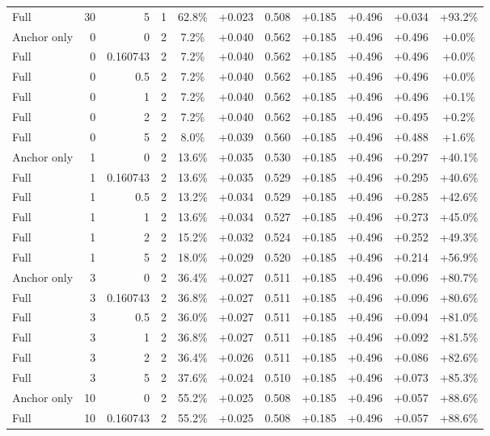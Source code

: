 \begin{table}[htbp]
\begin{tabular}{lrrrccccccc}
Full & 30 & 5 & 1 & 62.8\% & +0.023 & 0.508 & +0.185 & +0.496 & +0.034 & +93.2\% \\
Anchor only & 0 & 0 & 2 & 7.2\% & +0.040 & 0.562 & +0.185 & +0.496 & +0.496 & +0.0\% \\
Full & 0 & 0.160743 & 2 & 7.2\% & +0.040 & 0.562 & +0.185 & +0.496 & +0.496 & +0.0\% \\
Full & 0 & 0.5 & 2 & 7.2\% & +0.040 & 0.562 & +0.185 & +0.496 & +0.496 & +0.0\% \\
Full & 0 & 1 & 2 & 7.2\% & +0.040 & 0.562 & +0.185 & +0.496 & +0.496 & +0.1\% \\
Full & 0 & 2 & 2 & 7.2\% & +0.040 & 0.562 & +0.185 & +0.496 & +0.495 & +0.2\% \\
Full & 0 & 5 & 2 & 8.0\% & +0.039 & 0.560 & +0.185 & +0.496 & +0.488 & +1.6\% \\
Anchor only & 1 & 0 & 2 & 13.6\% & +0.035 & 0.530 & +0.185 & +0.496 & +0.297 & +40.1\% \\
Full & 1 & 0.160743 & 2 & 13.6\% & +0.035 & 0.529 & +0.185 & +0.496 & +0.295 & +40.6\% \\
Full & 1 & 0.5 & 2 & 13.2\% & +0.034 & 0.529 & +0.185 & +0.496 & +0.285 & +42.6\% \\
Full & 1 & 1 & 2 & 13.6\% & +0.034 & 0.527 & +0.185 & +0.496 & +0.273 & +45.0\% \\
Full & 1 & 2 & 2 & 15.2\% & +0.032 & 0.524 & +0.185 & +0.496 & +0.252 & +49.3\% \\
Full & 1 & 5 & 2 & 18.0\% & +0.029 & 0.520 & +0.185 & +0.496 & +0.214 & +56.9\% \\
Anchor only & 3 & 0 & 2 & 36.4\% & +0.027 & 0.511 & +0.185 & +0.496 & +0.096 & +80.7\% \\
Full & 3 & 0.160743 & 2 & 36.8\% & +0.027 & 0.511 & +0.185 & +0.496 & +0.096 & +80.6\% \\
Full & 3 & 0.5 & 2 & 36.0\% & +0.027 & 0.511 & +0.185 & +0.496 & +0.094 & +81.0\% \\
Full & 3 & 1 & 2 & 36.8\% & +0.027 & 0.511 & +0.185 & +0.496 & +0.092 & +81.5\% \\
Full & 3 & 2 & 2 & 36.4\% & +0.026 & 0.511 & +0.185 & +0.496 & +0.086 & +82.6\% \\
Full & 3 & 5 & 2 & 37.6\% & +0.024 & 0.510 & +0.185 & +0.496 & +0.073 & +85.3\% \\
Anchor only & 10 & 0 & 2 & 55.2\% & +0.025 & 0.508 & +0.185 & +0.496 & +0.057 & +88.6\% \\
Full & 10 & 0.160743 & 2 & 55.2\% & +0.025 & 0.508 & +0.185 & +0.496 & +0.057 & +88.6\% \\

\end{tabular}
\end{table}
